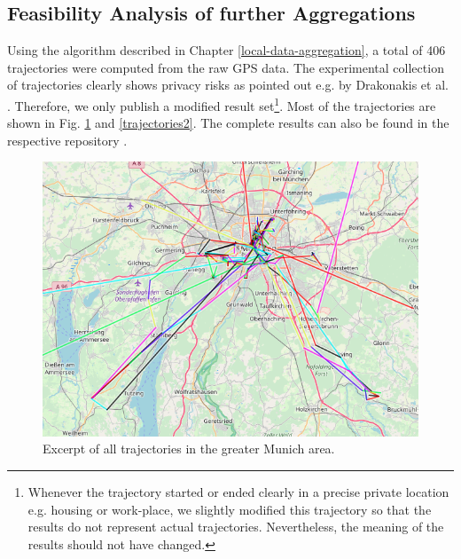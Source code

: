 \subsection{Feasibility Analysis of further Aggregations}\label{trajectories}
Using the algorithm described in Chapter \ref{local-data-aggregation}, a total of 406 trajectories were computed from the raw GPS data. The experimental collection of trajectories clearly shows privacy risks as pointed out e.g. by Drakonakis et al. \parencite{cellphone}. Therefore, we only publish a modified result set\footnote{Whenever the trajectory started or ended clearly in a precise private location e.g. housing or work-place, we slightly modified this trajectory so that the results do not represent actual trajectories. Nevertheless, the meaning of the results should not have changed.}. Most of the trajectories are shown in Fig. \ref{trajectories1} and \ref{trajectories2}. The complete results can also be found in the respective repository \parencite{github-results}.

\begin{figure}[h!]
	\includegraphics[width=\textwidth]{data/trajectories-2.png}
	\caption{Excerpt of all trajectories in the greater Munich area.}
	\label{trajectories1}
\end{figure}

